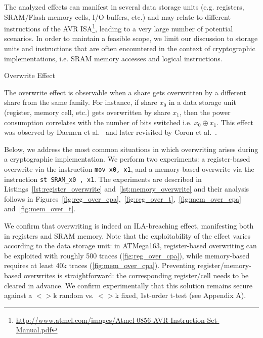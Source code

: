 The analyzed effects can manifest in several data storage units (e.g. registers, SRAM/Flash memory cells, I/O buffers, etc.) and may relate to different instructions of the AVR ISA\footnote{\url{http://www.atmel.com/images/Atmel-0856-AVR-Instruction-Set-Manual.pdf}}, leading to a very large number of potential scenarios. In order to maintain a feasible scope, we limit our discussion to storage units and instructions that are often encountered in the context of cryptographic implementations, i.e. SRAM memory accesses and logical instructions.
\begin{subsection}{Overwrite Effect}\label{overwrite}

The overwrite effect is observable when a share gets overwritten by a different share from the same family. For instance, if share $x_0$ in a data storage unit (register, memory cell, etc.) gets overwritten by share $x_1$, then the power consumption correlates with the number of bits switched i.e. $x_0 \oplus x_1$. This effect was observed by Daemen et al.~\cite{noteonsca} and later revisited by Coron et al.~\cite{DBLP:conf/cosade/CoronGPRRV12}.

Below, we address the most common situations in which overwriting arises during a cryptographic implementation. We perform two experiments: a register-based overwrite via the instruction \texttt{mov x0, x1}, and a memory-based overwrite via the instruction \texttt{st SRAM\_x0 ,  x1}. The experiments are described in Listings~\ref{lst:register_overwrite} and~\ref{lst:memory_overwrite} and their analysis follows in Figures~\ref{fig:reg_over_cpa},~\ref{fig:reg_over_t},~\ref{fig:mem_over_cpa} and~\ref{fig:mem_over_t}.

We confirm that overwriting is indeed an ILA-breaching effect, manifesting both in registers and SRAM memory. Note that the exploitability of the effect varies according to the data storage unit: in ATMega163, register-based overwriting can be exploited with roughly 500 traces (\ref{fig:reg_over_cpa}), while memory-based requires at least 40k traces (\ref{fig:mem_over_cpa}). Preventing register/memory-based overwrites is straightforward: the corresponding register/cell needs to be cleared in advance. We confirm experimentally that this solution remains secure against a $<>$k random vs. $<>$k fixed, 1st-order t-test (see Appendix A).


\end{subsection}
